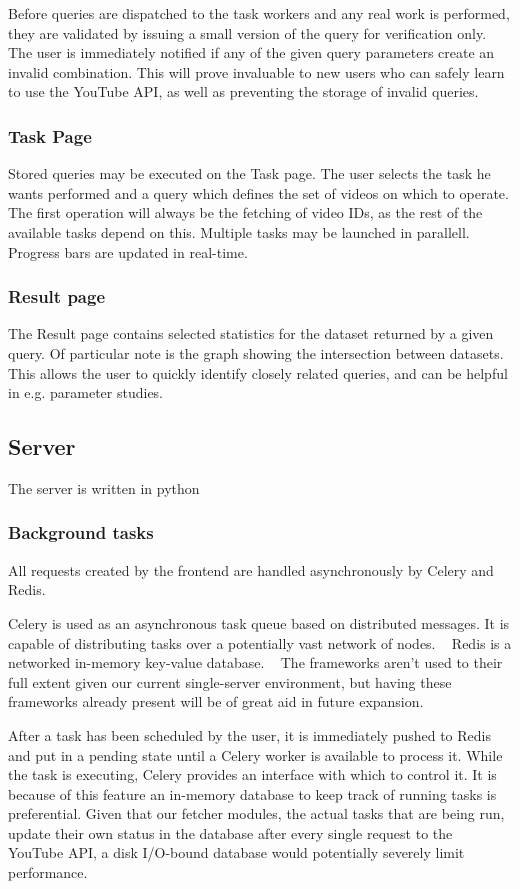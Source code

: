 Before queries are dispatched to the task workers and any real work is
performed, they are validated by issuing a small version of the query for
verification only. The user is immediately notified if any of the given query
parameters create an invalid combination. This will prove invaluable to new
users who can safely learn to use the YouTube API, as well as preventing
the storage of invalid queries.


\subsubsection{Task Page}
Stored queries may be executed on the Task page. The user selects the task he
wants performed and a query which defines the set of videos on which to operate.
The first operation will always be the fetching of video IDs, as the rest of the
available tasks depend on this. Multiple tasks may be launched in parallell.
Progress bars are updated in real-time. %


\subsubsection{Result page}
The Result page contains selected statistics for the dataset returned by a given
query. Of particular note is the graph showing the intersection between datasets. This
allows the user to quickly identify closely related queries, and can be helpful
in e.g. parameter studies.


\subsection{Server}
The server is written in python %


\subsubsection{Background tasks}
All requests created by the frontend are handled asynchronously by Celery and
Redis.

Celery is used as an asynchronous task queue based on distributed messages. It
is capable of distributing tasks over a potentially vast network of nodes.
~\cite{architecture:celery} Redis is a networked in-memory key-value database.
~\cite{architecture:redis} The frameworks aren't used to their full extent given
our current single-server environment, but having these frameworks already
present will be of great aid in future expansion.

After a task has been scheduled by the user, it is immediately pushed to Redis
and put in a pending state until a Celery worker is available to process it.
While the task is executing, Celery provides an interface with which to control
it. It is because of this feature an in-memory database to keep track of running
tasks is preferential. Given that our fetcher modules, the actual tasks that are
being run, update their own status in the database after every single request to
the YouTube API, a disk I/O-bound database would potentially severely limit
performance.

